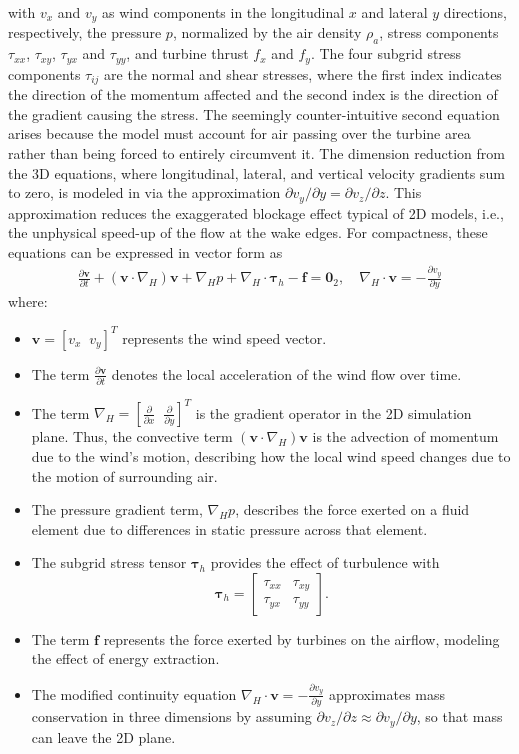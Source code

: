 with $v_x$ and $v_y$ as wind components in the longitudinal $x$ and lateral $y$ directions, respectively, the pressure $p$, normalized by the air density $\rho_a$, stress components $\tau_{xx}$, $\tau_{xy}$, $\tau_{yx}$ and $\tau_{yy}$, and turbine thrust $f_x$ and $f_y$. The four subgrid stress components $\tau_{ij}$ are the normal and shear stresses, where the first index indicates the direction of the momentum affected and the second index is the direction of the gradient causing the stress. The seemingly counter-intuitive second equation arises because the model must account for air passing over the turbine area rather than being forced to entirely circumvent it. The dimension reduction from the 3D equations, where longitudinal, lateral, and vertical velocity gradients sum to zero, is modeled in \cite{boersma2018control} via the approximation $\partial v_y/\partial y = \partial v_z/\partial z$. 
This approximation reduces the exaggerated blockage effect typical of 2D models, i.e., the unphysical speed-up of the flow at the wake edges. 
%
For compactness, these equations can be expressed in vector form as
\begin{align} \label{eq:NSE2d}
    \frac{\partial \bm{v}}{\partial t}+ (\bm{v}\cdot \nabla_H)\bm{v} + \nabla_H p + \nabla_H\cdot\bm{\tau}_h  - \bm{f} = \bm{0}_{2},\quad  
    \nabla_H\cdot \bm{v} = -\frac{\partial v_y}{\partial y}
\end{align}
where:
\begin{itemize}
    \item $\bm{v} =[v_x\;\;v_y]^T$ represents the wind speed vector.
    \item The term $\frac{\partial \bm{v}}{\partial t}$ denotes the local acceleration of the wind flow over time.
    \item The term $\nabla_H = [\frac{\partial}{\partial x}\;\;\frac{\partial}{\partial y}]^T$ is the gradient operator in the 2D simulation plane. Thus, the convective term $(\bm{v}\cdot \nabla_H)\bm{v}$ is the advection of momentum due to the wind's motion, describing how the local wind speed changes due to the motion of surrounding air.
    \item The pressure gradient term, $\nabla_H p$, describes the force exerted on a fluid element due to differences in static pressure across that element.
    \item The subgrid stress tensor $\boldsymbol{\tau}_h$ provides the effect of turbulence with
    \[
    \boldsymbol{\tau}_h =
    \begin{bmatrix}
        \tau_{xx} & \tau_{xy} \\
        \tau_{yx} & \tau_{yy}
    \end{bmatrix}.
    \]
    \item The term $\bm{f}$ represents the force exerted by turbines on the airflow, modeling the effect of energy extraction.
    \item The modified continuity equation $\nabla_H\cdot \bm{v} = - \frac{\partial v_y}{\partial y}$ approximates mass conservation in three dimensions by assuming $\partial v_z/\partial z \approx \partial v_y/\partial y$, so that mass can leave the 2D plane.
\end{itemize}
